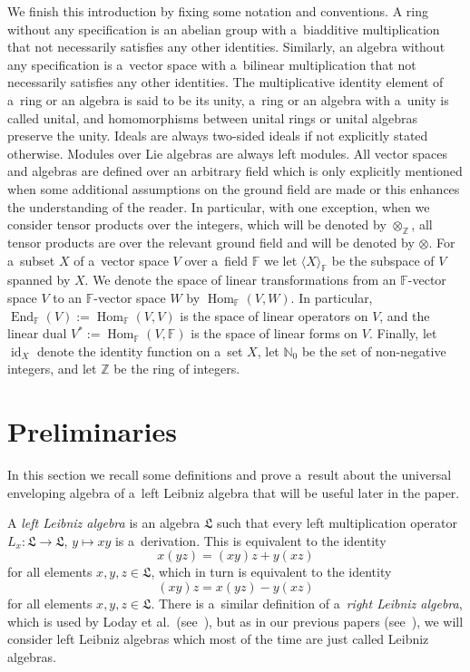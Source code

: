 \documentclass{jonasart}
\DeclareMathOperator{\End}{End}
\DeclareMathOperator{\Hom}{Hom}
\DeclareMathOperator{\id}{id}
\newcommand{\fbb}{\mathbb{F}}
\newcommand{\lf}{\mathfrak{L}}
\newcommand{\nbb}{\mathbb{N}}
\newcommand{\zbb}{\mathbb{Z}}
\begin{document}
	We finish this introduction by fixing some notation and conventions. A ring without any specification is an abelian group with a~biadditive multiplication that not necessarily satisfies any other identities. Similarly, an algebra without any specification is a~vector space with a~bilinear multiplication that not necessarily satisfies any other identities. The multiplicative identity element of a~ring or an algebra is said to be its unity, a~ring or an algebra with a~unity is called unital, and homomorphisms between unital rings or unital algebras preserve the unity. Ideals are always two-sided ideals if not explicitly stated otherwise. Modules over Lie algebras are always left modules. All vector spaces and algebras are defined over an arbitrary field which is only explicitly mentioned when some additional assumptions on the ground field are made or this enhances the understanding of the reader. In particular, with one exception, when we consider tensor products over the integers, which will be denoted by $\otimes_\zbb$, all tensor products are over the relevant ground field and will be denoted by $\otimes$. For a~subset $X$ of a~vector space $V$ over a~field $\fbb$ we let $\langle X\rangle_\fbb$ be the subspace of $V$ spanned by $X$. We denote the space of linear transformations from an $\fbb$-vector space $V$ to an $\fbb$-vector space $W$ by $\Hom_\fbb(V,W)$. In particular, $\End_\fbb(V):=\Hom_\fbb(V,V)$ is the space of linear operators on $V$, and the linear dual $V^*:=\Hom_\fbb(V,\fbb)$
	is the space of linear forms on $V$. Finally, let $\id_X$ denote the identity function on a~set $X$, let $\nbb_0$ be the set of non-negative integers, and let $\zbb$ be the ring of integers.
\newpage  

	\section{Preliminaries}

	In this section we recall some definitions and prove a~result about the universal enveloping algebra of a~left Leibniz algebra that will be useful later in the paper.

	A \emph{left Leibniz algebra\/} is an algebra $\lf$ such that every left multiplication operator $L_x:\lf\to\lf$, $y\mapsto xy$ is a~derivation. This is equivalent to the identity
	\[
		x(yz)=(xy)z+y(xz)
	\]
	for all elements $x,y,z\in\lf$, which in turn is equivalent to the identity
	\[
		(xy)z=x(yz)-y(xz)
	\]
	for all elements $x,y,z\in\lf$. There is a~similar definition of a~\emph{right Leibniz algebra\/}, which is used by Loday et al.\ (see~\cite{L, CH, LP1}), but as in our previous papers (see~\cite{F1, F2, FW1}), we will consider left Leibniz algebras which most of the time are just called Leibniz algebras.
\end{document}

